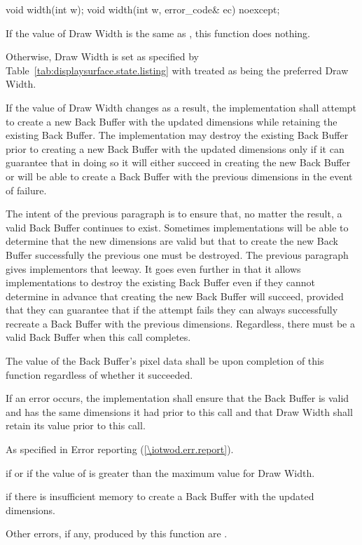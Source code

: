 \begin{itemdecl}
void width(int w);
void width(int w, error_code& ec) noexcept;
\end{itemdecl}
\begin{itemdescr}
\pnum
\effects
If the value of Draw Width is the same as , this function does nothing.

\pnum
Otherwise, Draw Width is set as specified by Table~\ref{tab:displaysurface.state.listing} with  treated as being the preferred Draw Width.

\pnum
If the value of Draw Width changes as a result, the implementation shall attempt to create a new Back Buffer with the updated dimensions while retaining the existing Back Buffer. The implementation may destroy the existing Back Buffer prior to creating a new Back Buffer with the updated dimensions only if it can guarantee that in doing so it will either succeed in creating the new Back Buffer or will be able to create a Back Buffer with the previous dimensions in the event of failure.

\pnum
\begin{note}
The intent of the previous paragraph is to ensure that, no matter the result, a valid Back Buffer continues to exist. Sometimes implementations will be able to determine that the new dimensions are valid but that to create the new Back Buffer successfully the previous one must be destroyed. The previous paragraph gives implementors that leeway. It goes even further in that it allows implementations to destroy the existing Back Buffer even if they cannot determine in advance that creating the new Back Buffer will succeed, provided that they can guarantee that if the attempt fails they can always successfully recreate a Back Buffer with the previous dimensions. Regardless, there must be a valid Back Buffer when this call completes.
\end{note}

\pnum
The value of the Back Buffer's pixel data shall be \unspecnorm upon completion of this function regardless of whether it succeeded.

\pnum
If an error occurs, the implementation shall ensure that the Back Buffer is valid and has the same dimensions it had prior to this call and that Draw Width shall retain its value prior to this call.

\pnum
\throws
As specified in Error reporting (\ref{\iotwod.err.report}).

\pnum
\errors
{} if  or if the value of  is greater than the maximum value for Draw Width.

 if there is insufficient memory to create a Back Buffer with the updated dimensions.

Other errors, if any, produced by this function are .
\end{itemdescr}

